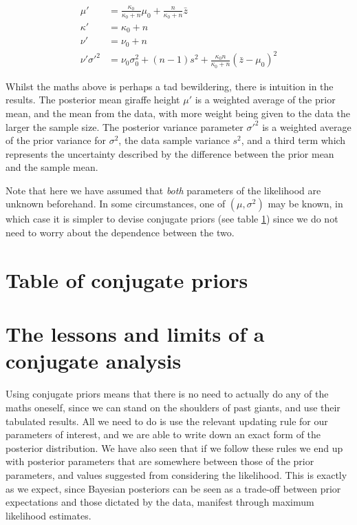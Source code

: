 \documentclass[11pt,fullpage]{book}
\begin{document}
\begin{align}
\mu' &= \frac{\kappa_0}{\kappa_0 + n}\mu_0 + \frac{n}{\kappa_0 + n} \bar{z}\\
\kappa' &= \kappa_0 + n\\
\nu' &= \nu_0 + n\\
\nu' \sigma'^2 &= \nu_0 \sigma_0^2 + (n-1)s^2 + \frac{\kappa_0 n}{\kappa_0 + n}(\bar{z} - \mu_0)^2
\end{align}

Whilst the maths above is perhaps a tad bewildering, there is intuition in the results. The posterior mean giraffe height $\mu'$ is a weighted average of the prior mean, and the mean from the data, with more weight being given to the data the larger the sample size. The posterior variance parameter $\sigma'^2$ is a weighted average of the prior variance for $\sigma^2$, the data sample variance $s^2$, and a third term which represents the uncertainty described by the difference between the prior mean and the sample mean.

Note that here we have assumed that \textit{both} parameters of the likelihood are unknown beforehand. In some circumstances, one of $(\mu,\sigma^2)$ may be known, in which case it is simpler to devise conjugate priors (see table \ref{sec:Conjugate_tableConjugatePriors}) since we do not need to worry about the dependence between the two. 

\section{Table of conjugate priors}\label{sec:Conjugate_tableConjugatePriors}

\section{The lessons and limits of a conjugate analysis}
Using conjugate priors means that there is no need to actually do any of the maths oneself, since we can stand on the shoulders of past giants, and use their tabulated results. All we need to do is use the relevant updating rule for our parameters of interest, and we are able to write down an exact form of the posterior distribution. We have also seen that if we follow these rules we end up with posterior parameters that are somewhere between those of the prior parameters, and values suggested from considering the likelihood. This is exactly as we expect, since Bayesian posteriors can be seen as a trade-off between prior expectations and those dictated by the data, manifest through maximum likelihood estimates.
\end{document}
